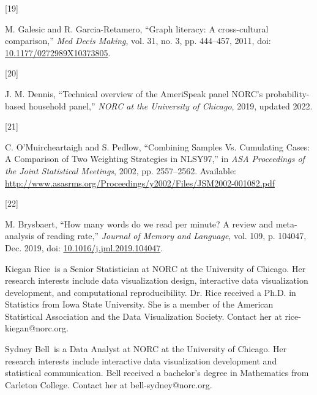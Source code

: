 \documentclass{IEEEcsmag}
\newlength{\cslhangindent}
\newlength{\csllabelwidth}
\newenvironment{CSLReferences}[2] %
 {\begin{list}{}{%
  \setlength{\itemindent}{0pt}
  \setlength{\leftmargin}{0pt}
  \setlength{\parsep}{0pt}
  \ifodd #1
   \setlength{\leftmargin}{\cslhangindent}
   \setlength{\itemindent}{-1\cslhangindent}
  \fi
  \setlength{\itemsep}{#2\baselineskip}}}
 {\end{list}}
\newcommand{\CSLLeftMargin}[1]{\parbox[t]{\csllabelwidth}{#1}}
\newcommand{\CSLRightInline}[1]{\parbox[t]{\linewidth - \csllabelwidth}{#1}\break}
\begin{document}
\begin{CSLReferences}{0}{0}
\CSLLeftMargin{{[}19{]} }%
\CSLRightInline{M. Galesic and R. Garcia-Retamero, {``Graph literacy: A cross-cultural comparison,''} \emph{Med Decis Making}, vol. 31, no. 3, pp. 444--457, 2011, doi: \href{https://doi.org/10.1177/0272989X10373805}{10.1177/0272989X10373805}.}

\CSLLeftMargin{{[}20{]} }%
\CSLRightInline{J. M. Dennis, {``Technical overview of the {AmeriSpeak} panel {NORC}'s probability-based household panel,''} \emph{NORC at the University of Chicago}, 2019, updated 2022.}

\CSLLeftMargin{{[}21{]} }%
\CSLRightInline{C. O'Muircheartaigh and S. Pedlow, {``Combining {Samples Vs}. {Cumulating Cases}: {A Comparison} of {Two Weighting Strategies} in {NLSY97},''} in \emph{{ASA Proceedings} of the {Joint Statistical Meetings}}, 2002, pp. 2557--2562. Available: \url{http://www.asasrms.org/Proceedings/y2002/Files/JSM2002-001082.pdf}}

\CSLLeftMargin{{[}22{]} }%
\CSLRightInline{M. Brysbaert, {``How many words do we read per minute? {A} review and meta-analysis of reading rate,''} \emph{Journal of Memory and Language}, vol. 109, p. 104047, Dec. 2019, doi: \href{https://doi.org/10.1016/j.jml.2019.104047}{10.1016/j.jml.2019.104047}.}

\end{CSLReferences}


\begin{IEEEbiography}{Kiegan Rice}{\,} is a Senior Statistician at NORC at the University of Chicago. Her research interests include data visualization design, interactive data visualization development, and computational reproducibility. Dr. Rice received a Ph.D. in Statistics from Iowa State University. She is a member of the American Statistical Association and the Data Visualization Society. Contact her at rice-kiegan@norc.org.%
\end{IEEEbiography}

\begin{IEEEbiography}{Sydney Bell}{\,} is a Data Analyst at NORC at the University of Chicago.  Her research interests include interactive data visualization development and statistical communication. Bell received a bachelor's degree in Mathematics from Carleton College. Contact her  at bell-sydney@norc.org.\vspace*{8pt}
\end{IEEEbiography}
\end{document}
